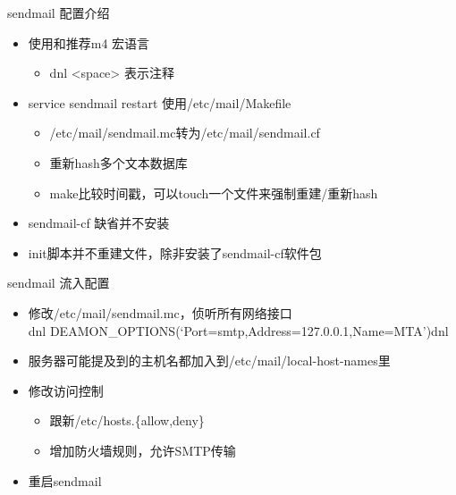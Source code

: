 \begin{frame}{sendmail 配置介绍}
\begin{itemize}
\item 使用和推荐m4 宏语言

\begin{itemize}
\item dnl <space> 表示注释
\end{itemize}
\item service sendmail restart 使用/etc/mail/Makefile

\begin{itemize}
\item /etc/mail/sendmail.mc转为/etc/mail/sendmail.cf
\item 重新hash多个文本数据库
\item make比较时间戳，可以touch一个文件来强制重建/重新hash
\end{itemize}
\item sendmail-cf 缺省并不安装
\item init脚本并不重建文件，除非安装了sendmail-cf软件包
\end{itemize}

\end{frame} 
\begin{frame}{sendmail 流入配置}
\begin{itemize}
\item 修改/etc/mail/sendmail.mc，侦听所有网络接口\\
dnl DEAMON\_OPTIONS(`Port=smtp,Address=127.0.0.1,Name=MTA')dnl
\item 服务器可能提及到的主机名都加入到/etc/mail/local-host-names里
\item 修改访问控制

\begin{itemize}
\item 跟新/etc/hosts.\{allow,deny\}
\item 增加防火墙规则，允许SMTP传输
\end{itemize}
\item 重启sendmail
\end{itemize}

\end{frame} 
